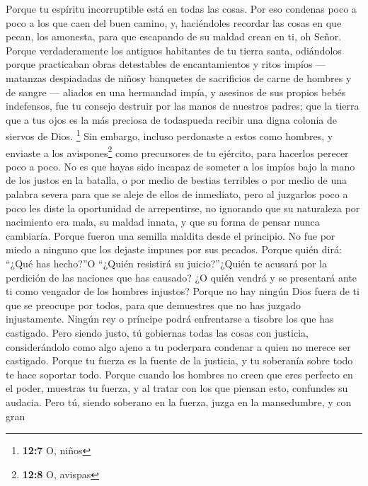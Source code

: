  Porque tu espíritu incorruptible está en todas las cosas.
 Por eso condenas poco a poco a los que caen del buen
camino, y, haciéndoles recordar las cosas en que pecan, los amonesta,
para que escapando de su maldad crean en ti, oh Señor. 
Porque verdaderamente los antiguos habitantes de tu tierra santa,
 odiándolos porque practicaban obras detestables de
encantamientos y ritos impíos ---  matanzas despiadadas de
niñosy banquetes de sacrificios de carne de hombres y de sangre ---
 aliados en una hermandad impía, y asesinos de sus propios
bebés indefensos, fue tu consejo destruir por las manos de nuestros
padres;  que la tierra que a tus ojos es la más preciosa
de todaspueda recibir una digna colonia de siervos de Dios. \footnote{\textbf{12:7}
  O, niños}  Sin embargo, incluso perdonaste a estos como
hombres, y enviaste a los avispones\footnote{\textbf{12:8} O, avispas}
como precursores de tu ejército, para hacerlos perecer poco a poco.
 No es que hayas sido incapaz de someter a los impíos bajo
la mano de los justos en la batalla, o por medio de bestias terribles o
por medio de una palabra severa para que se aleje de ellos de inmediato,
 pero al juzgarlos poco a poco les diste la oportunidad
de arrepentirse, no ignorando que su naturaleza por nacimiento era mala,
su maldad innata, y que su forma de pensar nunca cambiaría.
 Porque fueron una semilla maldita desde el principio. No
fue por miedo a ninguno que los dejaste impunes por sus pecados.
 Porque quién dirá: ``¿Qué has hecho?''O ``¿Quién
resistirá su juicio?''¿Quién te acusará por la perdición de las naciones
que has causado? ¿O quién vendrá y se presentará ante ti como vengador
de los hombres injustos?  Porque no hay ningún Dios fuera
de ti que se preocupe por todos, para que demuestres que no has juzgado
injustamente.  Ningún rey o príncipe podrá enfrentarse a
tisobre los que has castigado.  Pero siendo justo, tú
gobiernas todas las cosas con justicia, considerándolo como algo ajeno a
tu poderpara condenar a quien no merece ser castigado. 
Porque tu fuerza es la fuente de la justicia, y tu soberanía sobre todo
te hace soportar todo.  Porque cuando los hombres no
creen que eres perfecto en el poder, muestras tu fuerza, y al tratar con
los que piensan esto, confundes su audacia.  Pero tú,
siendo soberano en la fuerza, juzga en la mansedumbre, y con gran
